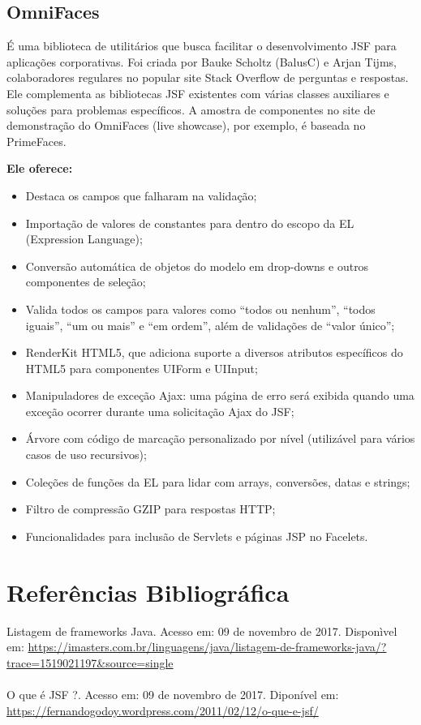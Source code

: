 \documentclass[12pt,a4paper]{article}
\begin{document}
\subsection{OmniFaces}
É uma biblioteca de utilitários que busca facilitar o desenvolvimento JSF para aplicações corporativas. Foi criada por Bauke Scholtz (BalusC) e Arjan Tijms, colaboradores regulares no popular site Stack Overflow de perguntas e respostas. Ele complementa as bibliotecas JSF existentes com várias classes auxiliares e soluções para problemas específicos. A amostra de componentes no site de demonstração do OmniFaces (live showcase), por exemplo, é baseada no PrimeFaces. 

\textbf{Ele oferece:}
\begin{itemize}
\item Destaca os campos que falharam na validação;

\item Importação de valores de constantes para dentro do escopo da EL (Expression Language);

\item Conversão automática de objetos do modelo em drop-downs e outros componentes de seleção;

\item Valida todos os campos para valores como “todos ou nenhum”, “todos iguais”, “um ou mais” e “em ordem”, além de validações de “valor único”;

\item RenderKit HTML5, que adiciona suporte a diversos atributos específicos do HTML5 para componentes UIForm e UIInput;

\item Manipuladores de exceção Ajax: uma página de erro será exibida quando uma exceção ocorrer durante uma solicitação Ajax do JSF;

\item Árvore com código de marcação personalizado por nível (utilizável para vários casos de uso recursivos);

\item Coleções de funções da EL para lidar com arrays, conversões, datas e strings;

\item Filtro de compressão GZIP para respostas HTTP;

\item Funcionalidades para inclusão de Servlets e páginas JSP no Facelets.

\end{itemize}

\section{Referências Bibliográfica}
\noindent 
Listagem de frameworks Java. Acesso em: 09 de novembro de 2017. Disponìvel em: \url {https://imasters.com.br/linguagens/java/listagem-de-frameworks-java/?trace=1519021197&source=single}
\\
\\\vspace{0.2cm}
O que é JSF ?. Acesso em: 09 de novembro de 2017. Diponível em: \url{https://fernandogodoy.wordpress.com/2011/02/12/o-que-e-jsf/}
\end{document}
